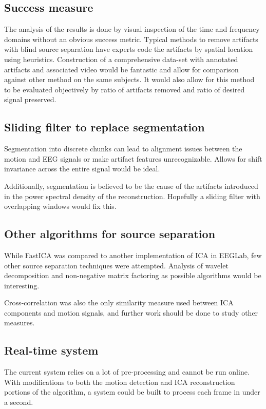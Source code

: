 \documentclass{acm_proc_article-sp}
\begin{document}
\subsection{Success measure}
The analysis of the results is done by visual inspection of the time
and frequency domains without an obvious success metric. Typical
methods to remove artifacts with blind source separation have experts
code the artifacts by spatial location using
heuristics\cite{jung2000a, jung2000b}. Construction of a comprehensive data-set with annotated artifacts
and associated video would be fantastic and allow for comparison
against other method on the same subjects. It would also allow for
this method to be evaluated objectively by ratio of artifacts removed
and ratio of desired signal preserved.
\subsection{Sliding filter to replace segmentation}\label{sliding_filter}
Segmentation into discrete chunks can lead to alignment issues between
the motion and EEG signals or make artifact features
unrecognizable. Allows for shift invariance across the entire signal
would be ideal.

Additionally, segmentation is believed to be the cause of the
artifacts introduced in the power spectral density of the
reconstruction. Hopefully a sliding filter with overlapping windows
would fix this.
\subsection{Other algorithms for source separation}
While FastICA\cite{hyvarinen1999} was compared to another implementation of ICA in EEGLab\cite{delorme2004},
few other source separation techniques were attempted. Analysis of
wavelet decomposition and non-negative matrix factoring as possible
algorithms would be interesting.

Cross-correlation was also the only similarity measure used between
ICA components and motion signals, and further work should be done to
study other measures.
\subsection{Real-time system}
The current system relies on a lot of pre-processing and cannot be run
online. With modifications to both the motion detection and ICA
reconstruction portions of the algorithm, a system could be built to
process each frame in under a second.
\end{document}
